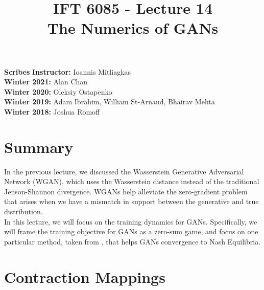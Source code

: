 \documentclass{article}
\title{IFT 6085 - Lecture 14 \\ 
The Numerics of GANs }
\date{}
\begin{document}
 

\maketitle


    \vspace{0.2in}


    \textbf{Scribes}\hfill
    \textbf{Instructor:}  Ioannis Mitliagkas\\
    \textbf{Winter 2021:} Alan Chan\\
    \textbf{Winter 2020:} Oleksiy Ostapenko\\
    \textbf{Winter 2019:} Adam Ibrahim, William St-Arnaud, Bhairav Mehta\\
    \textbf{Winter 2018:} Joshua Romoff\\





\newcommand{\infgc}{\inf_{g \in \mathcal{C}}}
\newcommand{\supgc}{\sup_{g \in \mathcal{C}}}

\newcommand{\Prob}{\mathbb{P}}
\newcommand{\E}{\mathbb{E}}
\newcommand{\reals}{\mathbb{R}}





\section{Summary}

In the previous lecture, we discussed the Wasserstein Generative Adversarial Network (WGAN), which uses the Wasserstein distance instead of the traditional Jenson-Shannon divergence. WGANs help alleviate the zero-gradient problem that arises when we have a mismatch in support between the generative and true distribution.
\\

In this lecture, we will focus on the training dynamics for GANs. Specifically, we will frame the training objective for GANs as a zero-sum game, and focus on one particular method, taken from \citet{MeschederNG17a}, that helps GANs convergence to Nash Equilibria. 

\section{Contraction Mappings}
\end{document}
